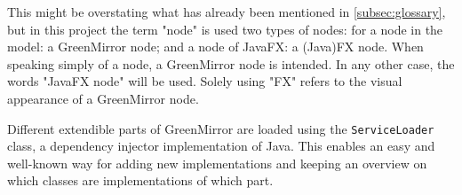 \documentclass[a4paper]{article}
\begin{document}
This might be overstating what has already been mentioned in \cref{subsec:glossary}, but in this project the term "node" is used two types of nodes: for a node in the model: a GreenMirror node; and a node of JavaFX: a (Java)FX node. When speaking simply of a node, a GreenMirror node is intended. In any other case, the words "JavaFX node" will be used. Solely using "FX" refers to the visual appearance of a GreenMirror node.

Different extendible parts of GreenMirror are loaded using the \lstinline{ServiceLoader} class, a dependency injector implementation of Java. This enables an easy and well-known way for adding new implementations and keeping an overview on which classes are implementations of which part.





\end{document}
